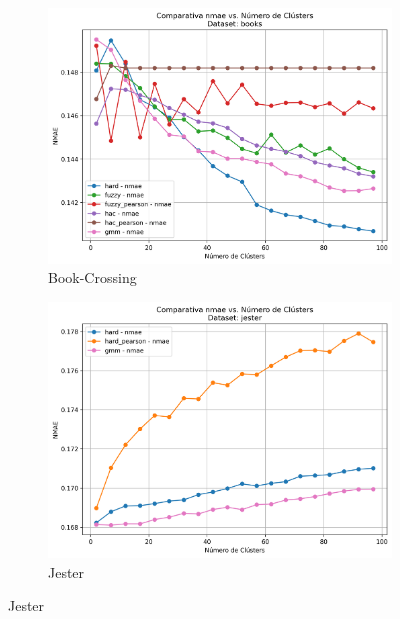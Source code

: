 \documentclass[a4paper,12pt]{report}
\begin{document}
\begin{figure}[H]
    \begin{subfigure}[b]{0.49\textwidth}
        \includegraphics[width=\textwidth]{Figuras/FinalResults/nmae-pear-books.png}
        \caption{Book-Crossing}
        \label{fig:nmae-books-c}
    \end{subfigure}
    \hfill
    \begin{subfigure}[b]{0.49\textwidth}
        \includegraphics[width=\textwidth]{Figuras/FinalResults/nmae-pear-jester.png}
        \caption{Jester}
        \label{fig:nmae-jester-d}
    \end{subfigure}


\end{figure}
\end{document}
